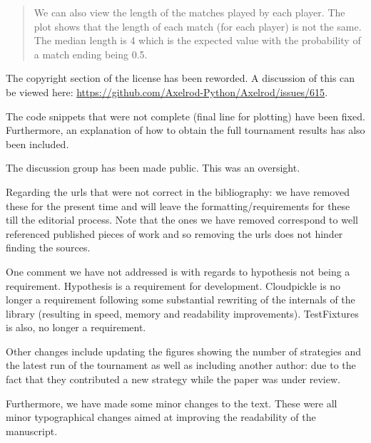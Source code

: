 \documentclass{article}
\begin{document}
\begin{quote}
    We can also view the length of the matches played by each player. The plot
    shows that the length of each match (for each player) is not the same. The
    median length is 4 which is the expected value with the probability of a
    match ending being 0.5.
\end{quote}

The copyright section of the license has been reworded. A discussion of this can
be viewed here: \url{https://github.com/Axelrod-Python/Axelrod/issues/615}.

The code snippets that were not complete (final line for plotting) have been
fixed. Furthermore, an explanation of how to obtain the full tournament results
has also been included.

The discussion group has been made public. This was an oversight.

Regarding the urls that were not correct in the bibliography: we have removed
these for the present time and will leave the formatting/requirements for these
till the editorial process. Note that the ones we have removed correspond to
well referenced published pieces of work and so removing the urls does not
hinder finding the sources.

One comment we have not addressed is with regards to hypothesis not being a
requirement.  Hypothesis is a requirement for development. Cloudpickle is no
longer a requirement following some substantial rewriting of the internals of
the library (resulting in speed, memory and readability improvements).
TestFixtures is also, no longer a requirement.

Other changes include updating the figures showing the number of strategies and
the latest run of the tournament as well as including another author: due to the
fact that they contributed a new strategy while the paper was under review.

Furthermore, we have made some minor changes to the text. These were all minor
typographical changes aimed at improving the readability of the manuscript.
\end{document}
